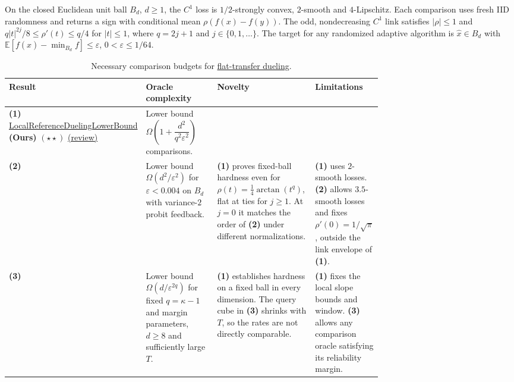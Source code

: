 \begin{table}[tp]
\centering
\caption{Necessary comparison budgets for \href{https://github.com/k3nfalt/longtails/blob/main/LongTails/Setups/FlatTransferDueling.lean}{flat-transfer dueling}.}\label{tab:FlatTransferDueling}
\parbox{\linewidth}{\footnotesize On the closed Euclidean unit ball $B_d$, $d\ge1$, the $C^1$ loss is $1/2$-strongly convex, $2$-smooth and $4$-Lipschitz. Each comparison uses fresh IID randomness and returns a sign with conditional mean $\rho(f(x)-f(y))$. The odd, nondecreasing $C^1$ link satisfies $|\rho|\le1$ and $q|t|^{2j}/8\le\rho'(t)\le q/4$ for $|t|\le1$, where $q=2j+1$ and $j\in\{0,1,\ldots\}$. The target for any randomized adaptive algorithm is $\hat x\in B_d$ with $\mathbb E[f(\hat x)-\min_{B_d}f]\le\varepsilon$, $0<\varepsilon\le1/64$.}\par\smallskip
\begin{threeparttable}
\footnotesize
\setlength{\tabcolsep}{4pt}\renewcommand{\arraystretch}{1.25}
\begin{tabularx}{\linewidth}{@{}>{\raggedright\arraybackslash}p{0.20\linewidth}>{\raggedright\arraybackslash}p{0.24\linewidth}>{\raggedright\arraybackslash}p{0.29\linewidth}>{\raggedright\arraybackslash}X@{}}
\toprule
\textbf{Result} & \textbf{Oracle complexity} & \textbf{Novelty} & \textbf{Limitations} \\
\midrule
\textbf{(1)} \href{https://github.com/k3nfalt/longtails/blob/main/LongTails/Theorems/LocalReferenceDuelingLowerBound.lean}{Local\allowbreak Reference\allowbreak Dueling\allowbreak Lower\allowbreak Bound} \textbf{(Ours)} $(\star\star)$ \href{https://github.com/k3nfalt/longtails/blob/main/scripts/reviews/LocalReferenceDuelingLowerBound.md}{(review)} & Lower bound $\Omega\!\left(1+\dfrac{d^2}{q^2\varepsilon^2}\right)$ comparisons. & & \\
\midrule[1.2pt]
\textbf{(2)} \citep[Thm.~14]{ftdKumagai2017v2} & Lower bound $\Omega(d^2/\varepsilon^2)$ for $\varepsilon<0.004$ on $B_d$ with variance-$2$ probit feedback. & \textbf{(1)} proves fixed-ball hardness even for $\rho(t)=\tfrac14\arctan(t^q)$, flat at ties for $j\ge1$. At $j=0$ it matches the order of \textbf{(2)} under different normalizations. & \textbf{(1)} uses $2$-smooth losses. \textbf{(2)} allows $3.5$-smooth losses and fixes $\rho'(0)=1/\sqrt{\pi}$, outside the link envelope of \textbf{(1)}. \\
\midrule
\textbf{(3)} \citep[Thm.~1, Lem.~1]{ftdJamieson2012v1} & Lower bound $\Omega(d/\varepsilon^{2q})$ for fixed $q=\kappa-1$ and margin parameters, $d\ge8$ and sufficiently large $T$. & \textbf{(1)} establishes hardness on a fixed ball in every dimension. The query cube in \textbf{(3)} shrinks with $T$, so the rates are not directly comparable. & \textbf{(1)} fixes the local slope bounds and window. \textbf{(3)} allows any comparison oracle satisfying its reliability margin. \\

\end{tabularx}
\end{threeparttable}
\end{table}
